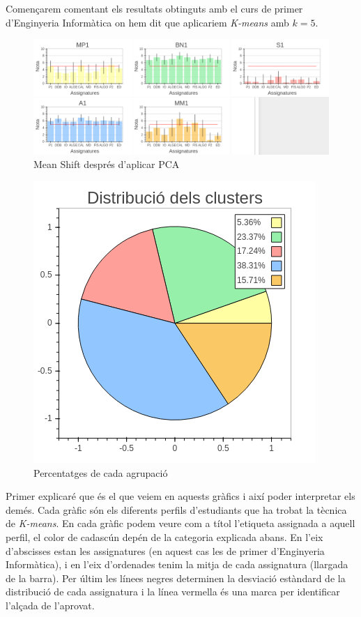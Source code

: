 \documentclass[12pt,a4paper,catalan]{article}
\begin{document}
\newpage

Començarem comentant els resultats obtinguts amb el curs de primer d'Enginyeria Informàtica on hem dit que aplicariem \textit{K-means} amb $k=5$.

\begin{figure}[h]
\centering
\includegraphics[width=\linewidth]{img/perfils_primer_info.png}
\caption{Mean Shift després d'aplicar PCA}
\end{figure}

\begin{figure}[h]
\centering
\includegraphics[width=.55\linewidth]{img/perfils_primer_info_pastilla.png}
\caption{Percentatges de cada agrupació}
\end{figure}

Primer explicaré que és el que veiem en aquests gràfics i així poder interpretar els demés. Cada gràfic són els diferents perfils d'estudiants que ha trobat la tècnica de \textit{K-means}. En cada gràfic podem veure com a títol l'etiqueta assignada a aquell perfil, el color de cadascún depén de la categoria explicada abans. En l'eix d'abscisses estan les assignatures (en aquest cas les de primer d'Enginyeria Informàtica), i en l'eix d'ordenades tenim la mitja de cada assignatura (llargada de la barra). Per últim les línees negres determinen la desviació estàndard de la distribució de cada assignatura i la línea vermella és una marca per identificar l'alçada de l'aprovat.
\end{document}
